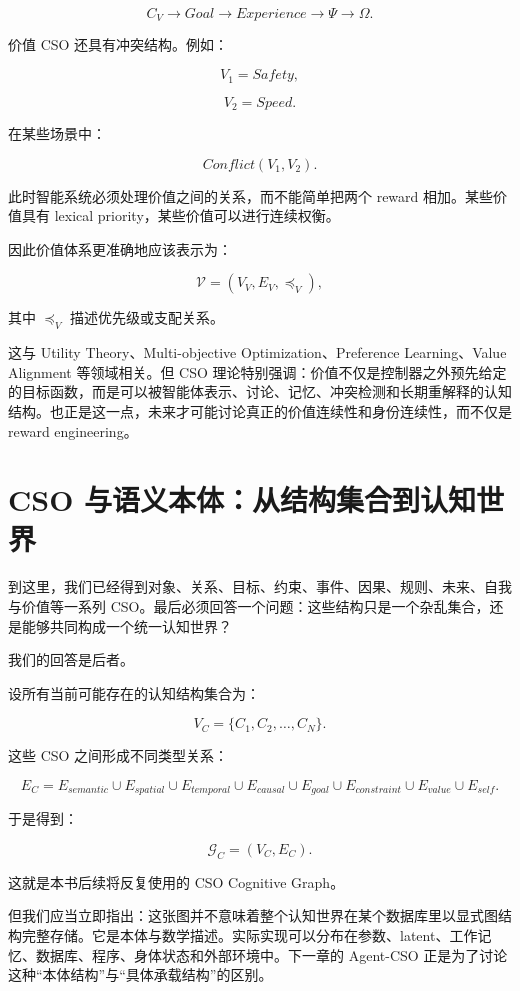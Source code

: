 \[
C_V
\rightarrow
Goal
\rightarrow
Experience
\rightarrow
\Psi
\rightarrow
\Omega.
\]

价值 CSO 还具有冲突结构。例如：

\[
V_1=Safety,
\]

\[
V_2=Speed.
\]

在某些场景中：

\[
Conflict(V_1,V_2).
\]

此时智能系统必须处理价值之间的关系，而不能简单把两个 reward 相加。某些价值具有 lexical priority，某些价值可以进行连续权衡。

因此价值体系更准确地应该表示为：

\[
\mathcal V
=
(V_V,E_V,\preceq_V),
\]

其中 \(\preceq_V\) 描述优先级或支配关系。

这与 Utility Theory、Multi-objective Optimization、Preference Learning、Value Alignment 等领域相关。但 CSO 理论特别强调：价值不仅是控制器之外预先给定的目标函数，而是可以被智能体表示、讨论、记忆、冲突检测和长期重解释的认知结构。也正是这一点，未来才可能讨论真正的价值连续性和身份连续性，而不仅是 reward engineering。


\section{CSO 与语义本体：从结构集合到认知世界}

到这里，我们已经得到对象、关系、目标、约束、事件、因果、规则、未来、自我与价值等一系列 CSO。最后必须回答一个问题：这些结构只是一个杂乱集合，还是能够共同构成一个统一认知世界？

我们的回答是后者。

设所有当前可能存在的认知结构集合为：

\[
V_C
=
\{
C_1,C_2,\ldots,C_N
\}.
\]

这些 CSO 之间形成不同类型关系：

\[
E_C
=
E_{semantic}
\cup
E_{spatial}
\cup
E_{temporal}
\cup
E_{causal}
\cup
E_{goal}
\cup
E_{constraint}
\cup
E_{value}
\cup
E_{self}.
\]

于是得到：

\[
\boxed{
\mathcal G_C
=
(V_C,E_C).
}
\]

这就是本书后续将反复使用的 CSO Cognitive Graph。

但我们应当立即指出：这张图并不意味着整个认知世界在某个数据库里以显式图结构完整存储。它是本体与数学描述。实际实现可以分布在参数、latent、工作记忆、数据库、程序、身体状态和外部环境中。下一章的 Agent-CSO 正是为了讨论这种“本体结构”与“具体承载结构”的区别。


